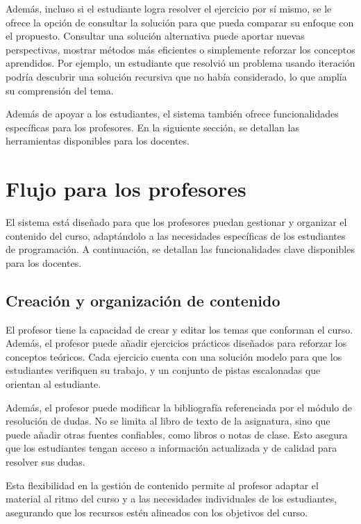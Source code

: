 \documentclass{article}
\begin{document}
Además, incluso si el estudiante logra resolver el ejercicio por sí mismo, se le ofrece la opción de consultar la solución para que pueda comparar su enfoque con el propuesto. Consultar una solución alternativa puede aportar nuevas perspectivas, mostrar métodos más eficientes o simplemente reforzar los conceptos aprendidos. Por ejemplo, un estudiante que resolvió un problema usando iteración podría descubrir una solución recursiva que no había considerado, lo que amplía su comprensión del tema.

Además de apoyar a los estudiantes, el sistema también ofrece funcionalidades específicas para los profesores. En la siguiente sección, se detallan las herramientas disponibles para los docentes.

\section{Flujo para los profesores}\label{sec:teachers}

El sistema está diseñado para que los profesores puedan gestionar y organizar el contenido del curso, adaptándolo a las necesidades específicas de los estudiantes de programación. A continuación, se detallan las funcionalidades clave disponibles para los docentes.

\subsection{Creación y organización de contenido}

El profesor tiene la capacidad de crear y editar los temas que conforman el curso. Además, el profesor puede añadir ejercicios prácticos diseñados para reforzar los conceptos teóricos. Cada ejercicio cuenta con una solución modelo para que los estudiantes verifiquen su trabajo, y un conjunto de pistas escalonadas que orientan al estudiante.

Además, el profesor puede modificar la bibliografía referenciada por el módulo de resolución de dudas. No se limita al libro de texto de la asignatura, sino que puede añadir otras fuentes confiables, como libros o notas de clase. Esto asegura que los estudiantes tengan acceso a información actualizada y de calidad para resolver sus dudas.

Esta flexibilidad en la gestión de contenido permite al profesor adaptar el material al ritmo del curso y a las necesidades individuales de los estudiantes, asegurando que los recursos estén alineados con los objetivos del curso.
\end{document}
